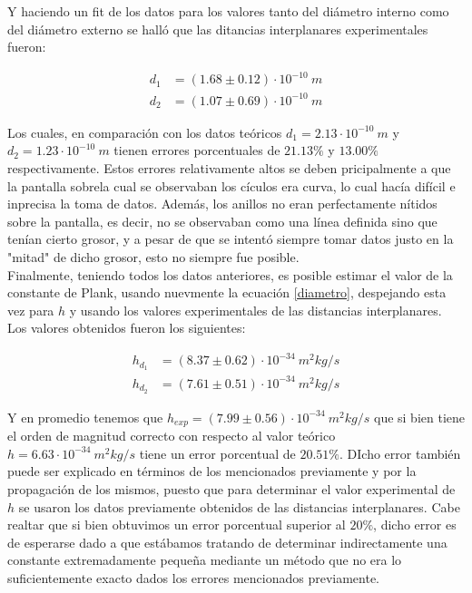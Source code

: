 \documentclass[prb,aps,twocolumn,preprintnumbers,amsmath,amssymb]{revtex4}
\begin{document}
Y haciendo un fit de los datos para los valores tanto del diámetro interno como del diámetro externo se halló que las ditancias interplanares experimentales fueron:

\begin{equation}
\label{lissa}
\begin{split}
d_{1} &= (1.68 \pm 0.12 )\cdot 10^{-10}\ m\\
d_{2} &= (1.07 \pm 0.69 )\cdot 10^{-10}\ m
\end{split}
\end{equation}

Los cuales, en comparación con los datos teóricos $d_{1} = 2.13 \cdot 10^{-10}\ m$ y $d_{2} = 1.23 \cdot 10^{-10}\ m$ tienen errores porcentuales de $21.13\%$ y $13.00\%$ respectivamente. Estos errores relativamente altos se deben pricipalmente a que la pantalla sobrela cual se observaban los cículos era curva, lo cual hacía difícil e inprecisa la toma de datos. Además, los anillos no eran perfectamente nítidos sobre la pantalla, es decir, no se observaban como una línea definida sino que tenían cierto grosor, y a pesar de que se intentó siempre tomar datos justo en la "mitad" de dicho grosor, esto no siempre fue posible.\\

Finalmente, teniendo todos los datos anteriores, es posible estimar el valor de la constante de Plank, usando nuevmente la ecuación \eqref{diametro}, despejando esta vez para $h$ y usando los valores experimentales de las distancias interplanares. Los valores obtenidos fueron los siguientes:

\begin{equation}
\label{lissa}
\begin{split}
h_{d_{1}} &= (8.37 \pm 0.62) \cdot 10^{-34}\ m^2kg/s\\
h_{d_{2}} &= (7.61 \pm 0.51) \cdot 10^{-34}\ m^2kg/s
\end{split}
\end{equation}

Y en promedio tenemos que $h_{exp} = (7.99 \pm 0.56) \cdot 10^{-34}\ m^2kg/s$ que si bien tiene el orden de magnitud correcto con respecto al valor teórico $h = 6.63 \cdot 10^{-34}\ m^2kg/s$ tiene un error porcentual de $20.51\%$. DIcho error también puede ser explicado en términos de los mencionados previamente y por la propagación de los mismos, puesto que para determinar el valor experimental de $h$ se usaron los datos previamente obtenidos de las distancias interplanares. Cabe realtar que si bien obtuvimos un error porcentual superior al $20\%$, dicho error es de esperarse dado a que estábamos tratando de determinar indirectamente una constante extremadamente pequeña mediante un método que no era lo suficientemente exacto dados los errores mencionados previamente.
\end{document}

